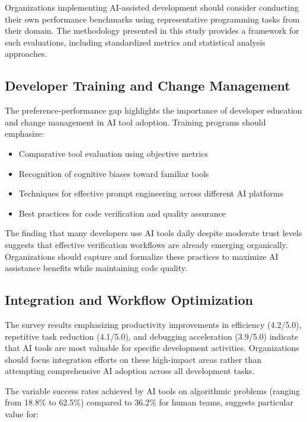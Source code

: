 \documentclass[conference]{IEEEtran}
\begin{document}
Organizations implementing AI-assisted development should consider conducting their own performance benchmarks using representative programming tasks from their domain. The methodology presented in this study provides a framework for such evaluations, including standardized metrics and statistical analysis approaches.

\subsection{Developer Training and Change Management}

The preference-performance gap highlights the importance of developer education and change management in AI tool adoption. Training programs should emphasize:

\begin{itemize}
    \item Comparative tool evaluation using objective metrics
    \item Recognition of cognitive biases toward familiar tools
    \item Techniques for effective prompt engineering across different AI platforms
    \item Best practices for code verification and quality assurance
\end{itemize}

The finding that many developers use AI tools daily despite moderate trust levels suggests that effective verification workflows are already emerging organically. Organizations should capture and formalize these practices to maximize AI assistance benefits while maintaining code quality.

\subsection{Integration and Workflow Optimization}

The survey results emphasizing productivity improvements in efficiency (4.2/5.0), repetitive task reduction (4.1/5.0), and debugging acceleration (3.9/5.0) indicate that AI tools are most valuable for specific development activities. Organizations should focus integration efforts on these high-impact areas rather than attempting comprehensive AI adoption across all development tasks.

The variable success rates achieved by AI tools on algorithmic problems (ranging from 18.8\% to 62.5\%) compared to 36.2\% for human teams, suggests particular value for:
\end{document}
